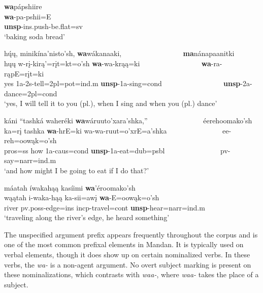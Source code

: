 \begin{exe}
\begin{xlist}
	\item \glll \textbf{wa}pápshiire\\
	\textbf{wa}-pa-pshii=E\\
	\textbf{unsp}-ins.push-\textnormal{be.flat}=sv\\
	\glt `baking soda bread' \citep[14]{benson1999}
	
	\item \glll hų́ų, minikína'nisto'sh, \textbf{wa}wákanaaki, ~ ~ ~ ~ ~ ~ ~ ~ ~ ~ \textbf{ma}nánapaanitki\\
	hųų w-rį-kirą'=rįt=kt=o'sh \textbf{wa}-wa-krąą=ki ~ ~ ~ ~ ~ ~ ~ ~ ~ ~ \textbf{wa}-ra-rąpE=rįt=ki\\
	\textnormal{yes} 1a-2s-\textnormal{tell}=2pl=pot=ind.m \textbf{unsp}-1a-\textnormal{sing}=cond ~ ~ ~ ~ ~ ~ ~ ~ ~ ~ \textbf{unsp}-2a-\textnormal{dance}=2pl=cond\\
	\glt `yes, I will tell it to you (pl.), when I sing and when you (pl.) dance' \citep[32]{hollow1973b}
	
\item \glll káni ``tashká waheréki \textbf{wa}wáruuto'xara'shka,'' ~ ~ ~ ~ ~ ~ ~ ~ ~  éerehoomako'sh\\
	ka=rį tashka \textbf{wa}-hrE=ki wa-wa-ruut=o'xrE=a'shka  ~ ~ ~ ~ ~ ~ ~ ~ ~ ee-reh=oowąk=o'sh\\
	pros=ss \textnormal{how} 1a-caus=cond \textbf{unsp}-1a-\textnormal{eat}=dub=psbl ~ ~ ~ ~ ~ ~ ~ ~ ~  pv-\textnormal{say}=narr=ind.m\\
	\glt `and how might I be going to eat if I do that?' \citep[46]{hollow1973b}
	
	\item \glll máatah íwakahąą kasíimi \textbf{wa}'éroomako'sh\\
	wąątah i-waka-hąą ka-sii=awį \textbf{wa}-E=oowąk=o'sh\\
	\textnormal{river} pv.poss-\textnormal{edge}=ins incp-\textnormal{travel}=cont \textbf{unsp}-\textnormal{hear}=narr=ind.m\\
	\glt `traveling along the river's edge, he heard something' \citep[28]{hollow1973a}

	
	\end{xlist}
	
\end{exe}

The unspecified argument prefix appears frequently throughout the corpus and is one of the most common prefixal elements in Mandan. It is typically used on verbal elements, though it does show up on certain nominalized verbs. In these verbs, the \textit{wa-} is a non-agent argument. No overt subject marking is present on these nominalizations, which contrasts with \textit{waa-}, where \textit{waa-} takes the place of a subject.

